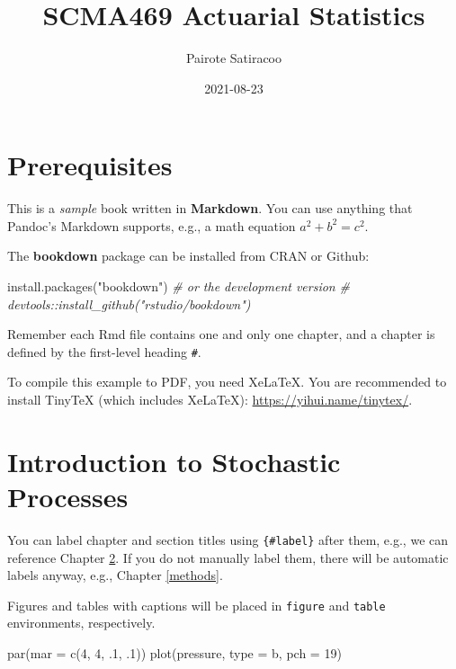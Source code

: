 \documentclass[
]{book}
\title{SCMA469 Actuarial Statistics}
\author{Pairote Satiracoo}
\date{2021-08-23}
\newenvironment{Shaded}{\begin{snugshade}}{\end{snugshade}}
\newcommand{\AttributeTok}[1]{\textcolor[rgb]{0.77,0.63,0.00}{#1}}
\newcommand{\CommentTok}[1]{\textcolor[rgb]{0.56,0.35,0.01}{\textit{#1}}}
\newcommand{\DecValTok}[1]{\textcolor[rgb]{0.00,0.00,0.81}{#1}}
\newcommand{\FunctionTok}[1]{\textcolor[rgb]{0.00,0.00,0.00}{#1}}
\newcommand{\NormalTok}[1]{#1}
\newcommand{\StringTok}[1]{\textcolor[rgb]{0.31,0.60,0.02}{#1}}
\theoremstyle{definition}
\theoremstyle{definition}
\theoremstyle{definition}
\theoremstyle{definition}
\theoremstyle{remark}
\begin{document}
\maketitle

{
\setcounter{tocdepth}{1}
\tableofcontents
}
\hypertarget{prerequisites}{%
\chapter{Prerequisites}\label{prerequisites}}

This is a \emph{sample} book written in \textbf{Markdown}. You can use anything that Pandoc's Markdown supports, e.g., a math equation \(a^2 + b^2 = c^2\).

The \textbf{bookdown} package can be installed from CRAN or Github:

\begin{Shaded}
\begin{Highlighting}[]
\FunctionTok{install.packages}\NormalTok{(}\StringTok{"bookdown"}\NormalTok{)}
\CommentTok{\# or the development version}
\CommentTok{\# devtools::install\_github("rstudio/bookdown")}
\end{Highlighting}
\end{Shaded}

Remember each Rmd file contains one and only one chapter, and a chapter is defined by the first-level heading \texttt{\#}.

To compile this example to PDF, you need XeLaTeX. You are recommended to install TinyTeX (which includes XeLaTeX): \url{https://yihui.name/tinytex/}.

\hypertarget{intro}{%
\chapter{Introduction to Stochastic Processes}\label{intro}}

You can label chapter and section titles using \texttt{\{\#label\}} after them, e.g., we can reference Chapter \ref{intro}. If you do not manually label them, there will be automatic labels anyway, e.g., Chapter \ref{methods}.

Figures and tables with captions will be placed in \texttt{figure} and \texttt{table} environments, respectively.

\begin{Shaded}
\begin{Highlighting}[]
\FunctionTok{par}\NormalTok{(}\AttributeTok{mar =} \FunctionTok{c}\NormalTok{(}\DecValTok{4}\NormalTok{, }\DecValTok{4}\NormalTok{, .}\DecValTok{1}\NormalTok{, .}\DecValTok{1}\NormalTok{))}
\FunctionTok{plot}\NormalTok{(pressure, }\AttributeTok{type =} \StringTok{\textquotesingle{}b\textquotesingle{}}\NormalTok{, }\AttributeTok{pch =} \DecValTok{19}\NormalTok{)}
\end{Highlighting}
\end{Shaded}
\end{document}
